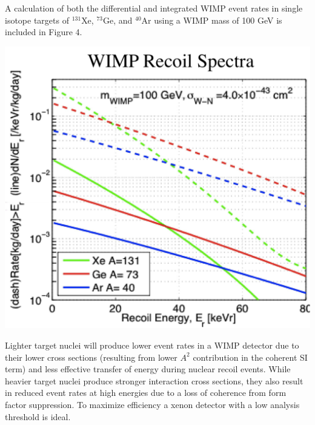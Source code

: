 \documentclass[a4paper,12pt]{article}
\begin{document}
A calculation of both the differential and integrated WIMP event rates in single isotope targets of  $^{131}$Xe, $^{73}$Ge, and $^{40}$Ar using a WIMP mass of 100 GeV is included in Figure 4.

\begin{center}
\includegraphics[scale=0.5]{Recoil-spectrum.png}
\end{center}

Lighter target nuclei will produce lower event rates in a WIMP detector due to their lower cross sections (resulting from lower $A^2$ contribution in the coherent SI term) and less effective transfer of energy during nuclear recoil events. While heavier target nuclei produce stronger interaction cross sections, they also result in reduced event rates at high energies due to a loss of coherence from form factor suppression.  To maximize efficiency a xenon detector with a low analysis threshold is ideal.

\end{document}
